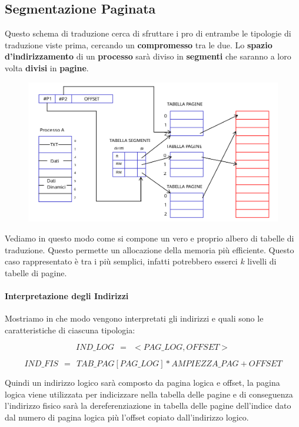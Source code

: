 \documentclass{article}
\begin{document}
\subsection{Segmentazione Paginata}

Questo schema di traduzione cerca di sfruttare i pro di entrambe le tipologie di traduzione viste prima, cercando un \textbf{compromesso} tra le due. Lo \textbf{spazio d'indirizzamento} di un \textbf{processo} sarà diviso in \textbf{segmenti} che saranno a loro volta \textbf{divisi} in \textbf{pagine}.

\begin{figure}[htbp]
    \center
    \includegraphics[scale=0.3]{img/segmentazione_paginata.png}
\end{figure}

Vediamo in questo modo come si compone un vero e proprio albero di tabelle di \\ traduzione.
Questo permette un allocazione della memoria più efficiente. Questo caso rappresentato è tra i più semplici, infatti potrebbero esserci $k$ livelli di tabelle di pagine.

\paragraph{Interpretazione degli Indirizzi} Mostriamo in che modo vengono interpretati gli indirizzi e quali sono le caratteristiche di ciascuna tipologia:

\[ IND\_LOG \:\: = \:\: < PAG\_LOG, OFFSET> \]

\vspace*{-15px}

\[ IND\_FIS \:\: = \:\: TAB\_PAG[PAG\_LOG] * AMPIEZZA\_PAG + OFFSET \]

Quindi un indirizzo logico sarà composto da pagina logica e offset, la pagina logica viene utilizzata per indicizzare nella tabella delle pagine e di conseguenza
l'indirizzo fisico sarà la dereferenziazione in tabella delle pagine dell'indice dato dal numero di pagina logica più l'offset copiato dall'indirizzo logico. 
\vspace*{5px}
\end{document}
